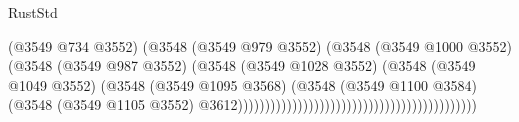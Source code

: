 \begin{lexlean}{RustStd}
\begin{coremodule}
                                                                            (@3549 @734 @3552)
                                                                            (@3548
                                                                              (@3549 @979 @3552)
                                                                              (@3548
                                                                                (@3549 @1000 @3552)
                                                                                (@3548
                                                                                  (@3549 @987 @3552)
                                                                                  (@3548
                                                                                    (@3549
                                                                                      @1028
                                                                                      @3552)
                                                                                    (@3548
                                                                                      (@3549
                                                                                        @1049
                                                                                        @3552)
                                                                                      (@3548
                                                                                        (@3549
                                                                                          @1095
                                                                                          @3568)
                                                                                        (@3548
                                                                                          (@3549
                                                                                            @1100
                                                                                            @3584)
                                                                                          (@3548
                                                                                            (@3549
                                                                                              @1105
                                                                                              @3552)
                                                                                            @3612))))))))))))))))))))))))))))))))))))))))))))

\end{coremodule}
\end{lexlean}
